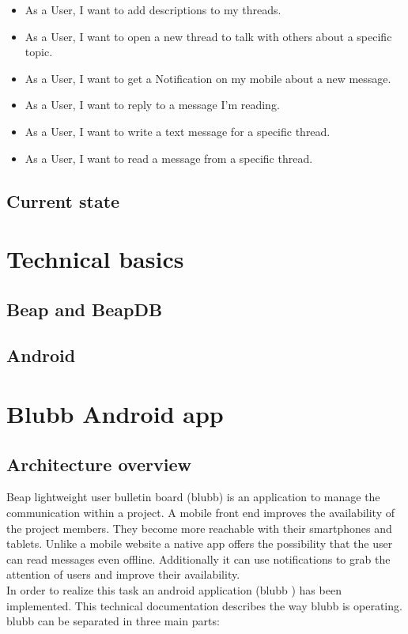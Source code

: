 \documentclass[12pt,a4paper,oneside]{report}
\newcommand{\appname}{blubb}
\newcommand{\blubb}{blubb}
\begin{document}
\begin{itemize}
     \item As a User, I want to add descriptions to my threads.
     \item As a User, I want to open a new thread to talk with others about a specific topic.
     \item As a User, I want to get a Notification on my mobile about a new message.
     \item As a User, I want to reply to a message I'm reading.
     \item As a User, I want to write a text message for a specific thread.
     \item As a User, I want to read a message from a specific thread. 
   \end{itemize}
\section{Current state}

\chapter{Technical basics}

\section{Beap and BeapDB}

\section{Android}

\chapter{Blubb Android app}
\section{Architecture overview}
 Beap lightweight user bulletin board (\blubb{}) is an application to manage the communication within a project. A mobile front end improves the availability of the project members. They become more reachable with their smartphones and tablets. Unlike a mobile website a native app offers the possibility that the user can read messages even offline. Additionally it can use notifications to grab the attention of users and improve their availability. \\
In order to realize this task an android application (\appname{} ) has been implemented. This technical documentation describes the way  \appname{} is operating.\\
\appname{} can be separated in three main parts: 
\end{document}
